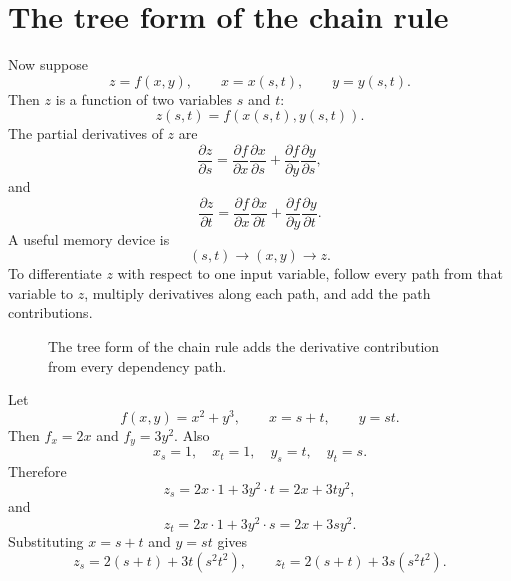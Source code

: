 \documentclass[11pt]{article}
\begin{document}
\section{The tree form of the chain rule}

Now suppose
\[
z=f(x,y),\qquad x=x(s,t),\qquad y=y(s,t).
\]
Then $z$ is a function of two variables $s$ and $t$:
\[
z(s,t)=f(x(s,t),y(s,t)).
\]
The partial derivatives of $z$ are
\[
\frac{\partial z}{\partial s}=\frac{\partial f}{\partial x}\frac{\partial x}{\partial s}+\frac{\partial f}{\partial y}\frac{\partial y}{\partial s},
\]
and
\[
\frac{\partial z}{\partial t}=\frac{\partial f}{\partial x}\frac{\partial x}{\partial t}+\frac{\partial f}{\partial y}\frac{\partial y}{\partial t}.
\]
A useful memory device is
\[
(s,t)\longrightarrow (x,y)\longrightarrow z.
\]
To differentiate $z$ with respect to one input variable, follow every path from that variable to $z$, multiply derivatives along each path, and add the path contributions.

\begin{figure}[H]
\centering
{}
\caption{The tree form of the chain rule adds the derivative contribution from every dependency path.}
\end{figure}

\begin{workedexample}
Let
\[
f(x,y)=x^2+y^3,\qquad x=s+t,\qquad y=st.
\]
Then $f_x=2x$ and $f_y=3y^2$. Also
\[
x_s=1,\quad x_t=1,\quad y_s=t,\quad y_t=s.
\]
Therefore
\[
z_s=2x\cdot 1+3y^2\cdot t=2x+3ty^2,
\]
and
\[
z_t=2x\cdot 1+3y^2\cdot s=2x+3sy^2.
\]
Substituting $x=s+t$ and $y=st$ gives
\[
z_s=2(s+t)+3t(s^2t^2),\qquad z_t=2(s+t)+3s(s^2t^2).
\]
\end{workedexample}
\end{document}
